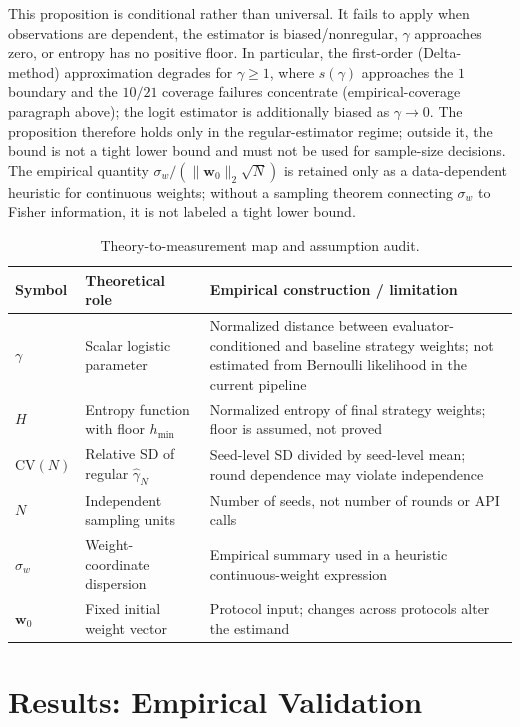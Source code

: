 \documentclass[11pt]{article}
\begin{document}
This proposition is conditional rather than universal. It fails to apply when observations are dependent, the estimator is biased/nonregular, $\gamma$ approaches zero, or entropy has no positive floor. In particular, the first-order (Delta-method) approximation degrades for $\gamma\geq 1$, where $s(\gamma)$ approaches the $1$ boundary and the $10/21$ coverage failures concentrate (empirical-coverage paragraph above); the logit estimator is additionally biased as $\gamma\to 0$. The proposition therefore holds only in the regular-estimator regime; outside it, the bound is not a tight lower bound and must not be used for sample-size decisions. The empirical quantity $\sigma_w/(\|\mathbf{w}_0\|_2\sqrt N)$ is retained only as a data-dependent heuristic for continuous weights; without a sampling theorem connecting $\sigma_w$ to Fisher information, it is not labeled a tight lower bound.

\begin{table}[t]
\centering
\caption{Theory-to-measurement map and assumption audit.}
\label{tab:estimand-map}
\small
\begin{tabular}{@{}p{}p{}p{}@{}}
\toprule
Symbol & Theoretical role & Empirical construction / limitation \\
\midrule
$\gamma$ & Scalar logistic parameter & Normalized distance between evaluator-conditioned and baseline strategy weights; not estimated from Bernoulli likelihood in the current pipeline \\
$H$ & Entropy function with floor $h_{\min}$ & Normalized entropy of final strategy weights; floor is assumed, not proved \\
$\mathrm{CV}(N)$ & Relative SD of regular $\hat\gamma_N$ & Seed-level SD divided by seed-level mean; round dependence may violate independence \\
$N$ & Independent sampling units & Number of seeds, not number of rounds or API calls \\
$\sigma_w$ & Weight-coordinate dispersion & Empirical summary used in a heuristic continuous-weight expression \\
$\mathbf w_0$ & Fixed initial weight vector & Protocol input; changes across protocols alter the estimand \\
\bottomrule
\end{tabular}
\end{table}

\section{Results: Empirical Validation}
\end{document}
